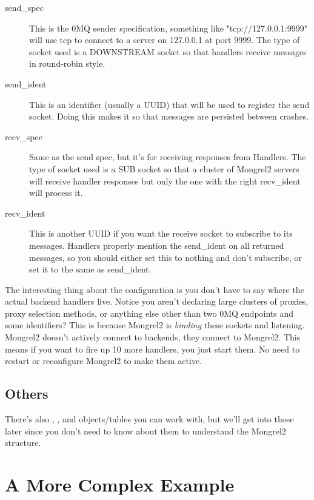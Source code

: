 \begin{description}
\item[send_spec]  This is the 0MQ sender specification, something like "tcp://127.0.0.1:9999" will
    use tcp to connect to a server on 127.0.0.1 at port 9999.  The type of socket used is a DOWNSTREAM
    socket so that handlers receive messages in round-robin style.
\item[send_ident] This is an identifier (usually a UUID) that will be used to register the send
    socket.  Doing this makes it so that messages are persisted between crashes.
\item[recv_spec] Same as the send spec, but it's for receiving responses from Handlers.  The type of
    socket used is a SUB socket so that a cluster of Mongrel2 servers will receive handler responses
    but only the one with the right recv_ident will process it.
\item[recv_ident] This is another UUID if you want the receive socket to subscribe to its messages.
    Handlers properly mention the send_ident on all returned messages, so you should either set this
    to nothing and don't subscribe, or set it to the same as send_ident.
\end{description}

The interesting thing about the  configuration is you don't have to say where the
actual backend handlers live.  Notice you aren't declaring large clusters of proxies, proxy selection
methods, or anything else other than two 0MQ endpoints and some identifiers?  This is because Mongrel2 is
\emph{binding} these sockets and listening.  Mongrel2 doesn't actively connect to backends, they connect
to Mongrel2.  This means if you want to fire up 10 more handlers, you just start them.  No need to restart
or reconfigure Mongrel2 to make them active.


\subsection{Others}

There's also , , and  objects/tables you can work
with, but we'll get into those later since you don't need to know about them to understand
the Mongrel2 structure.



\section{A More Complex Example}


